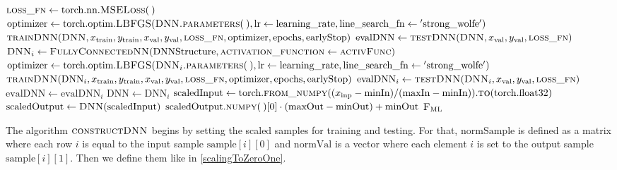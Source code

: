 \begin{algorithm}[H]
\begin{algorithmic}[1]
\State $\textproc{loss\_fn} \gets \mathrm{torch.nn.}\Call{MSELoss}{\:}$
\State $\mathrm{optimizer} \gets \mathrm{torch.optim.}\Call{LBFGS}{\protect\Call{DNN.parameters}{\:}, \mathrm{lr}\gets\mathrm{learning\_rate}, \mathrm{line\_search\_fn}\gets\mathrm{'strong\_wolfe'}}$
\State $\Call{trainDNN}{\textproc{DNN}, x_\mathrm{train}, y_\mathrm{train}, x_\mathrm{val}, y_\mathrm{val}, \textproc{loss\_fn}, \mathrm{optimizer}, \mathrm{epochs}, \mathrm{earlyStop}}$
\State\label{defEvalDNN} $\mathrm{evalDNN} \gets \Call{testDNN}{\textproc{DNN}, x_\mathrm{val}, y_\mathrm{val}, \textproc{loss\_fn}}$
\State $\textproc{DNN}_i \gets \Call{FullyConnectedNN}{\mathrm{DNNStructure}, \textproc{activation\_function}\gets\textproc{activFunc}}$
\State $\mathrm{optimizer} \gets \mathrm{torch.optim.}\Call{LBFGS}{\protect\Call{DNN$_i$.parameters}{\:}, \mathrm{lr}\gets\mathrm{learning\_rate}, \mathrm{line\_search\_fn}\gets\mathrm{'strong\_wolfe'}}$
\State $\Call{trainDNN}{\mathrm{DNN}_i, x_\mathrm{train}, y_\mathrm{train}, x_\mathrm{val}, y_\mathrm{val}, \textproc{loss\_fn}, \mathrm{optimizer}, \mathrm{epochs}, \mathrm{earlyStop}}$
\State $\mathrm{evalDNN}_i \gets \Call{testDNN}{\textproc{DNN}_i, x_\mathrm{val}, y_\mathrm{val}, \textproc{loss\_fn}}$
\State $\mathrm{evalDNN} \gets \mathrm{evalDNN}_i$
\State $\mathrm{DNN} \gets \mathrm{DNN}_i$
\EndIf
\EndFor
\State $\mathrm{scaledInput} \gets \mathrm{torch.}\Call{from\_numpy}{(x_\mathrm{inp}-\mathrm{minIn})/(\mathrm{maxIn}-\mathrm{minIn})}.\Call{to}{\mathrm{torch.float32}}$
\State $\mathrm{scaledOutput} \gets \Call{DNN}{\mathrm{scaledInput}}$
\State \Return $\mathrm{scaledOutput.}\Call{numpy}{\:}[0]\cdot(\mathrm{maxOut}-\mathrm{minOut})+\mathrm{minOut}$
\EndFunction
\State \Return $\textproc{F$_\mathrm{ML}$}$
\EndFunction
\end{algorithmic}
\end{algorithm}

The algorithm $\textproc{constructDNN}$ begins by setting the scaled samples for training and testing. For that, $\mathrm{normSample}$ is defined as a matrix where each row $i$ is equal to the input sample $\mathrm{sample}[i][0]$ and $\mathrm{normVal}$ is a vector where each element $i$ is set to the output sample $\mathrm{sample}[i][1]$. Then we define them like in \eqref{scalingToZeroOne}.

